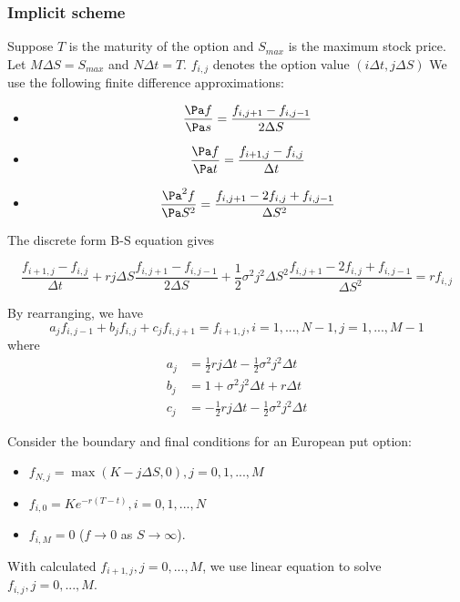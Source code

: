 \begin{refsection}
\subsubsection{Implicit scheme}
\begin{definition}
Suppose $T$ is the maturity of the option and $S_{max}$ is the maximum stock price. Let $M\Delta S = S_{max}$ and $N\Delta t = T$. $f_{i,j}$ denotes the option value $(i\Delta t, j\Delta S)$
We use the following finite difference approximations:
\begin{itemize}
	\item $$\frac{\Pa f}{\Pa s} = \frac{f_{i,j+1}-f_{i,j-1}}{2\Delta S}$$
	\item $$\frac{\Pa f}{\Pa t} = \frac{f_{i+1,j}-f_{i,j}}{\Delta t}$$
	\item $$\frac{\Pa^2 f}{\Pa S^2} = \frac{f_{i,j+1}-2f_{i,j}+f_{i,j-1}}{\Delta S^2}$$
	
\end{itemize}




The discrete form B-S equation gives

$$\frac{f_{i+1,j}-f_{i,j}}{\Delta t} + rj\Delta S \frac{f_{i,j+1}-f_{i,j-1}}{2\Delta S} + \frac{1}{2}\sigma^2j^2\Delta S^2 \frac{f_{i,j+1}-2f_{i,j}+f_{i,j-1}}{\Delta S^2} = rf_{i,j}$$

By rearranging, we have
$$a_j f_{i,j-1} + b_jf_{i,j} + c_j f_{i,j+1} = f_{i+1,j}, i=1,...,N-1, j=1,...,M-1$$
where
\begin{align*}
a_j & = \frac{1}{2}rj\Delta t - \frac{1}{2}\sigma^2j^2\Delta t\\
b_j &= 1 + \sigma^2 j^2 \Delta t + r\Delta t\\
c_j &= -\frac{1}{2}rj\Delta t - \frac{1}{2}\sigma^2 j^2 \Delta t
\end{align*}
\end{definition}

\begin{remark}
Consider the boundary and final conditions for an European put option:
\begin{itemize}
	\item $f_{N,j} = \max(K-j\Delta S,0),j=0,1,...,M$
	\item $f_{i,0} = Ke^{-r(T-t)},i=0,1,...,N$
	\item $f_{i,M}= 0$ ($f\to 0$ as $S \to \infty$).
\end{itemize}

With calculated $f_{i+1,j},j=0,...,M$, we use linear equation to solve $f_{i,j},j=0,...,M$.	
\end{remark}




\end{refsection}

